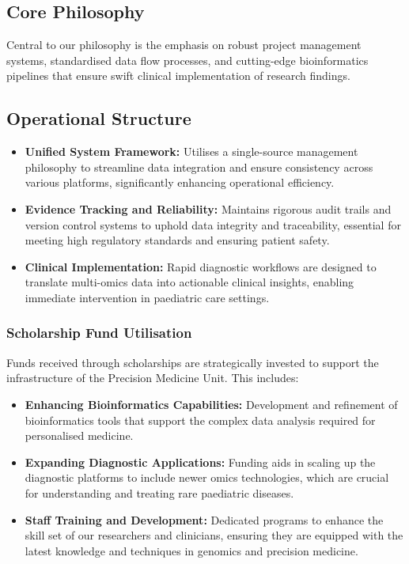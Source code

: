 \subsection*{Core Philosophy}

Central to our philosophy is the emphasis on robust project management systems, standardised data flow processes, and cutting-edge bioinformatics pipelines that ensure swift clinical implementation of research findings.

\subsection*{Operational Structure}
\begin{itemize}
    \item \textbf{Unified System Framework:} Utilises a single-source management philosophy to streamline data integration and ensure consistency across various platforms, significantly enhancing operational efficiency.
    \item \textbf{Evidence Tracking and Reliability:} Maintains rigorous audit trails and version control systems to uphold data integrity and traceability, essential for meeting high regulatory standards and ensuring patient safety.
    \item \textbf{Clinical Implementation:} Rapid diagnostic workflows are designed to translate multi-omics data into actionable clinical insights, enabling immediate intervention in paediatric care settings.
\end{itemize}

\subsubsection*{Scholarship Fund Utilisation}
Funds received through scholarships are strategically invested to support the infrastructure of the Precision Medicine Unit. This includes:
\begin{itemize}
    \item \textbf{Enhancing Bioinformatics Capabilities:} Development and refinement of bioinformatics tools that support the complex data analysis required for personalised medicine.
    \item \textbf{Expanding Diagnostic Applications:} Funding aids in scaling up the diagnostic platforms to include newer omics technologies, which are crucial for understanding and treating rare paediatric diseases.
    \item \textbf{Staff Training and Development:} Dedicated programs to enhance the skill set of our researchers and clinicians, ensuring they are equipped with the latest knowledge and techniques in genomics and precision medicine.
\end{itemize}

